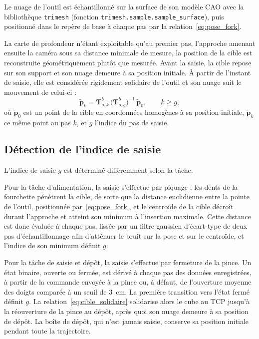 Le nuage de l'outil est échantillonné sur la surface de son modèle \ac{CAO} avec la bibliothèque \texttt{trimesh} (fonction \texttt{trimesh.sample.sample\_surface}), puis positionné dans le repère de base à chaque pas par la relation~\eqref{eq:pose_fork}.

La carte de profondeur n'étant exploitable qu'au premier pas, l'approche amenant ensuite la caméra sous sa distance minimale de mesure, la position de la cible est reconstruite géométriquement plutôt que mesurée. Avant la saisie, la cible repose sur son support et son nuage demeure à sa position initiale. À partir de l'instant de saisie, elle est considérée rigidement solidaire de l'outil et son nuage suit le mouvement de celui-ci :
\begin{equation}\label{eq:cible_solidaire}
  \tilde{\mathbf{p}}_k = \mathbf{T}_{o,k}^{b}\,\bigl(\mathbf{T}_{o,g}^{b}\bigr)^{-1}\,\tilde{\mathbf{p}}_0, \qquad k \ge g,
\end{equation}
où $\tilde{\mathbf{p}}_0$ est un point de la cible en coordonnées homogènes à sa position initiale, $\tilde{\mathbf{p}}_k$ ce même point au pas $k$, et $g$ l'indice du pas de saisie.

\subsection*{Détection de l'indice de saisie}

L'indice de saisie $g$ est déterminé différemment selon la tâche.

Pour la tâche d'alimentation, la saisie s'effectue par piquage : les dents de la fourchette pénètrent la cible, de sorte que la distance euclidienne entre la pointe de l'outil, positionnée par~\eqref{eq:pose_fork}, et le centroïde de la cible décroît durant l'approche et atteint son minimum à l'insertion maximale. Cette distance est donc évaluée à chaque pas, lissée par un filtre gaussien d'écart-type de deux pas d'échantillonnage afin d'atténuer le bruit sur la pose et sur le centroïde, et l'indice de son minimum définit $g$.

Pour la tâche de saisie et dépôt, la saisie s'effectue par fermeture de la pince. Un état binaire, ouverte ou fermée, est dérivé à chaque pas des données enregistrées, à partir de la commande envoyée à la pince ou, à défaut, de l'ouverture moyenne des doigts comparée à un seuil de $3$~cm. La première transition vers l'état fermé définit $g$. La relation~\eqref{eq:cible_solidaire} solidarise alors le cube au \ac{TCP} jusqu'à la réouverture de la pince au dépôt, après quoi son nuage demeure à sa position de dépôt. La boîte de dépôt, qui n'est jamais saisie, conserve sa position initiale pendant toute la trajectoire.

